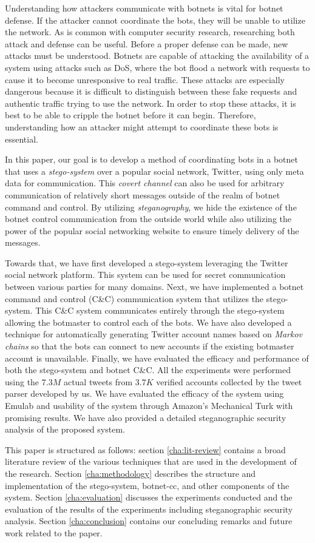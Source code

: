 Understanding how attackers communicate with botnets is vital for botnet
defense.  If the attacker cannot coordinate the bots, they will be unable to
utilize the network.  As is common with computer security research, researching
both attack and defense can be useful.  Before a proper defense can be made,
new attacks must be understood.  Botnets are capable of attacking the
availability of a system using attacks such as DoS, where the
bot flood a network with requests to cause it to become
unresponsive to real traffic.  These attacks are especially dangerous because it
is difficult to distinguish between these fake requests and authentic
traffic trying to use the network.  In order to stop these attacks, it is best
to be able to cripple the botnet before it can begin.  Therefore, understanding
how an attacker might attempt to coordinate these bots is essential.

In this paper, our goal is to develop a method of coordinating bots in a
botnet that uses a \emph{stego-system} over a popular
social network, Twitter, using only meta data for communication.  This 
\emph{covert channel} can also be used
for arbitrary communication of relatively short messages outside of the realm of
botnet command and control.  By utilizing \emph{steganography}, we hide the existence of
the botnet control communication from the outside world while also utilizing
the power of the popular social networking website to ensure timely delivery of the
messages.

Towards that, we have first developed
a stego-system leveraging the Twitter social network
platform.  This system can be used for secret communication between various
parties for many domains.  Next, we have implemented a
botnet command and control (C\&C) communication system that utilizes the stego-system.
This C\&C system communicates entirely through the stego-system allowing
the botmaster to control each of the bots. We have also developed a technique 
for automatically generating Twitter account
names based on \emph{Markov chains} so that the bots can connect to
new accounts if the existing botmaster account is unavailable. Finally, we have evaluated
the efficacy and performance of both the stego-system and botnet C\&C.
All the experiments were performed using the $7.3M$ actual tweets from $3.7K$ 
verified accounts collected by the tweet parser developed by us. We have
evaluated the efficacy of the system using Emulab and usability of the system 
through Amazon's Mechanical
Turk with promising results. We have also provided a detailed steganographic 
security analysis of the proposed system. 

This paper is structured as follows: section \ref{cha:lit-review} contains
a broad literature review of the various techniques that are used in the
development of the research. Section
\ref{cha:methodology} describes the structure and implementation of the
{stego-system}, {botnet-cc}, and other components of the
system.  Section \ref{cha:evaluation} discusses the experiments
conducted and the evaluation of the results of the experiments including 
steganographic security analysis.  Section \ref{cha:conclusion} contains our concluding
remarks and future work related to the paper.
